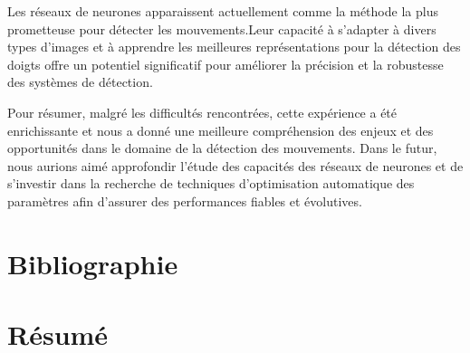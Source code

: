 \documentclass[11pt]{article}
\begin{document}
Les réseaux de neurones apparaissent actuellement comme la méthode la plus prometteuse pour détecter les mouvements.Leur capacité à s'adapter à divers types d'images et à apprendre les meilleures représentations pour la détection des doigts offre un potentiel significatif pour améliorer la précision et la robustesse des systèmes de détection. \bigbreak

Pour résumer, malgré les difficultés rencontrées, cette expérience a été enrichissante et nous a donné une meilleure compréhension des enjeux et des opportunités dans le domaine de la détection des mouvements. Dans le futur, nous aurions aimé approfondir l'étude des capacités des réseaux de neurones et de s'investir dans la recherche de techniques d'optimisation automatique des paramètres afin d'assurer des performances fiables et évolutives. \bigbreak

\newpage

\section*{Bibliographie}
\printbibliography

\newpage




\newpage

\newpage
\section*{Résumé}
\end{document}
